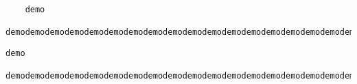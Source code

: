 \documentclass[a5paper]{article}
\begin{document}
\begin{lstlisting}
    demo
    demodemodemodemodemodemodemodemodemodemodemodemodemodemodemodemodemodemodemodemodemodemodemo
\end{lstlisting}


\begin{lstlisting}[alsoother=o]
    demo
    demodemodemodemodemodemodemodemodemodemodemodemodemodemodemodemodemodemodemodemodemodemodemo
\end{lstlisting}
\end{document}
